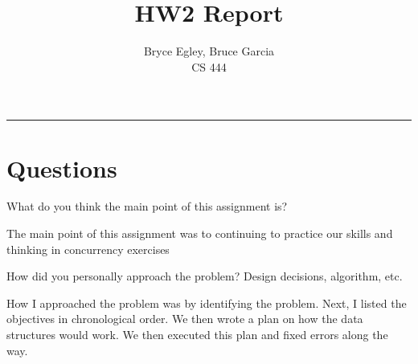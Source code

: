 \documentclass{article}
\newenvironment{question}[2][Question]{\begin{trivlist}
\item[\hskip \labelsep {\bfseries #1}\hskip \labelsep {\bfseries #2.}]}{\end{trivlist}}
\begin{document}

\title{HW2 Report} %
\author{Bryce Egley, Bruce Garcia\\CS 444} %

\maketitle
\hrule


%
%

\section*{Questions}

\begin{question}{1}
What do you think the main point of this assignment is?
\end{question}
The main point of this assignment was to continuing to practice our skills and thinking in concurrency exercises


\vspace{0.25in} %

\begin{question}{2}
How did you personally approach the problem? Design decisions, algorithm, etc.\end{question}
How I approached the problem was by identifying the problem. Next, I listed the objectives in chronological order. We then wrote a plan on how the data structures would work. We then executed this plan and fixed errors along the way.
\end{document}
